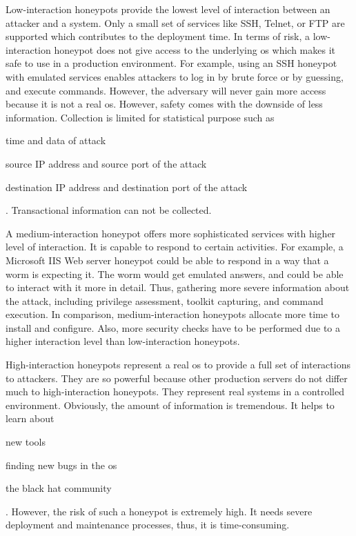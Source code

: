 Low-interaction honeypots provide the lowest level of interaction between an attacker and a system.
Only a small set of services like SSH, Telnet, or FTP are supported which contributes to the deployment time.
In terms of risk, a low-interaction honeypot does not give access to the underlying \ac{os} which makes it safe to use in a production environment.
For example, using an SSH honeypot with emulated services enables attackers to log in by brute force or by guessing, and execute commands.
However, the adversary will never gain more access because it is not a real \ac{os}.
However, safety comes with the downside of less information.
Collection is limited for statistical purpose such as
\begin{enumerate*}[label=(\roman*)]
    \item time and data of attack
    \item source IP address and source port of the attack
    \item destination IP address and destination port of the attack
\end{enumerate*}.
Transactional information can not be collected. \cite{Spitzner2003}

A medium-interaction honeypot offers more sophisticated services with higher level of interaction.
It is capable to respond to certain activities.
For example, a Microsoft IIS Web server honeypot could be able to respond in a way that a worm is expecting it.
The worm would get emulated answers, and could be able to interact with it more in detail.
Thus, gathering more severe information about the attack, including privilege assessment, toolkit capturing, and command execution.
In comparison, medium-interaction honeypots allocate more time to install and configure.
Also, more security checks have to be performed due to a higher interaction level than low-interaction honeypots. \cite{Spitzner2003}

High-interaction honeypots represent a real \ac{os} to provide a full set of interactions to attackers.
They are so powerful because other production servers do not differ much to high-interaction honeypots.
They represent real systems in a controlled environment.
Obviously, the amount of information is tremendous. It helps to learn about
\begin{enumerate*}[label=(\roman*)]
    \item new tools
    \item finding new bugs in the \ac{os}
    \item the black hat community
\end{enumerate*}. However, the risk of such a honeypot is extremely high.
It needs severe deployment and maintenance processes, thus, it is time-consuming.

